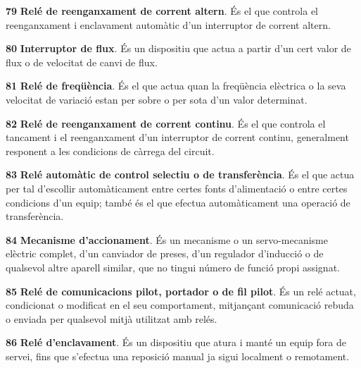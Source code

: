 \begin{multicols}{2}
\begin{list}{}
\item[\textbf{79}]   
\textbf{Relé de
reenganxament de corrent altern}. És el que controla el reenganxament i enclavament automàtic d'un
interruptor de corrent altern.

\item[\textbf{80}]   
\textbf{Interruptor de flux}. És un dispositiu que actua a partir d'un cert valor de flux o de velocitat de canvi de flux.

\item[\textbf{81}]   
\textbf{Relé de freqüència}. És el que actua
quan la freqüència elèctrica o la seva velocitat de variació estan per sobre o per sota d'un valor determinat.

\item[\textbf{82}]   
\textbf{Relé de
reenganxament de corrent continu}. És el que controla el tancament i el reenganxament d'un
interruptor de corrent continu, generalment responent a les condicions de càrrega del
circuit.

\item[\textbf{83}]  
\textbf{Relé automàtic de control selectiu o de transferència}. És
el que actua per tal d'escollir automàticament entre certes fonts
d'alimentació o entre certes condicions d'un equip; també és el que
efectua automàticament una operació de transferència.

\item[\textbf{84}]   
\textbf{Mecanisme d'accionament}. És un
mecanisme o un servo-mecanisme elèctric complet,  d'un canviador de
preses, d'un regulador d'inducció o de qualsevol altre aparell
similar, que no tingui número de funció propi assignat.

\item[\textbf{85}]   
\textbf{Relé de comunicacions pilot, portador o de fil pilot}. És un relé actuat, condicionat o modificat en el seu comportament, mitjançant comunicació rebuda o enviada per qualsevol mitjà utilitzat amb relés.

\item[\textbf{86}]   
\textbf{Relé d'enclavament}. És un dispositiu que atura i manté un equip fora de servei, fins que s'efectua una reposició manual ja sigui localment o remotament.


\end{list}
\end{multicols}
